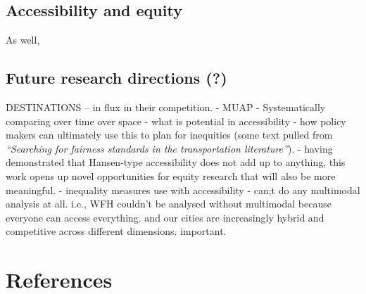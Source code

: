 \documentclass[
11pt, %
oneside, %
english, %
singlespacing, %
]{macthesis} %
\begin{document}
\section{Accessibility and equity}\label{accessibility-and-equity}

As well,

\section{Future research directions (?)}\label{future-research-directions}

DESTINATIONS -- in flux in their competition.
- MUAP
- Systematically comparing over time over space
- what is potential in accessibility
- how policy makers can ultimately use this to plan for inequities (some text pulled from \emph{``Searching for fairness standards in the transportation literature''}).
- having demonstrated that Hansen-type accessibility does not add up to anything, this work opens up novel opportunities for equity research that will also be more meaningful.
- inequality measures use with accessibility
- can;t do any multimodal analysis at all. i.e., WFH couldn't be analysed without multimodal because everyone can access everything. and our cities are increasingly hybrid and competitive across different dimensions. important.

\backmatter

\chapter*{References}\label{references}


\noindent

\setlength{\parindent}{-0.20in}
\setlength{\leftskip}{0.20in}
\setlength{\parskip}{8pt}
\end{document}
